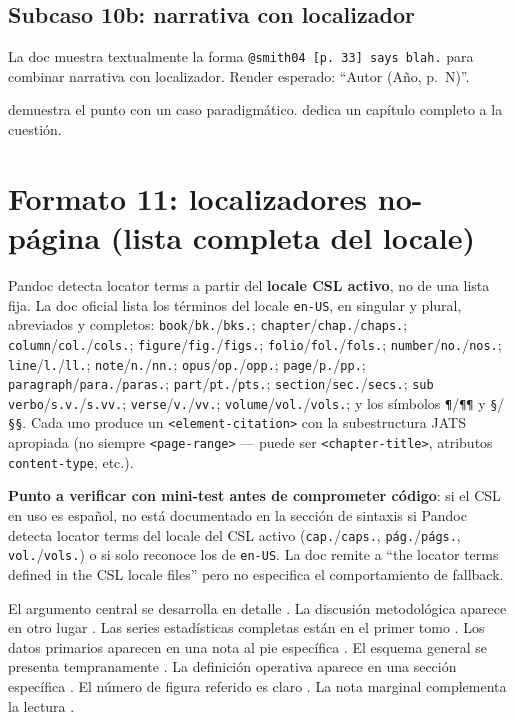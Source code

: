\subsection{Subcaso 10b: narrativa con localizador}
La doc muestra textualmente la forma \texttt{@smith04 [p. 33] says blah.} para combinar narrativa con localizador. Render esperado: “Autor (Año, p. N)”.

\textcite[p. 33]{2961-KACZAN2016} demuestra el punto con un caso paradigmático. \textcite[pp. 12-18]{3036-ORBUCH2020} dedica un capítulo completo a la cuestión.



\section{Formato 11: localizadores no-página (lista completa del locale)}
Pandoc detecta locator terms a partir del \textbf{locale CSL activo}, no de una lista fija. La doc oficial lista los términos del locale \texttt{en-US}, en singular y plural, abreviados y completos: \texttt{book}/\texttt{bk.}/\texttt{bks.}; \texttt{chapter}/\texttt{chap.}/\texttt{chaps.}; \texttt{column}/\texttt{col.}/\texttt{cols.}; \texttt{figure}/\texttt{fig.}/\texttt{figs.}; \texttt{folio}/\texttt{fol.}/\texttt{fols.}; \texttt{number}/\texttt{no.}/\texttt{nos.}; \texttt{line}/\texttt{l.}/\texttt{ll.}; \texttt{note}/\texttt{n.}/\texttt{nn.}; \texttt{opus}/\texttt{op.}/\texttt{opp.}; \texttt{page}/\texttt{p.}/\texttt{pp.}; \texttt{paragraph}/\texttt{para.}/\texttt{paras.}; \texttt{part}/\texttt{pt.}/\texttt{pts.}; \texttt{section}/\texttt{sec.}/\texttt{secs.}; \texttt{sub verbo}/\texttt{s.v.}/\texttt{s.vv.}; \texttt{verse}/\texttt{v.}/\texttt{vv.}; \texttt{volume}/\texttt{vol.}/\texttt{vols.}; y los símbolos \texttt{¶}/\texttt{¶¶} y \texttt{§}/\texttt{§§}. Cada uno produce un \texttt{<element-citation>} con la subestructura JATS apropiada (no siempre \texttt{<page-range>} — puede ser \texttt{<chapter-title>}, atributos \texttt{content-type}, etc.).

\textbf{Punto a verificar con mini-test antes de comprometer código}: si el CSL en uso es español, no está documentado en la sección de sintaxis si Pandoc detecta locator terms del locale del CSL activo (\texttt{cap.}/\texttt{caps.}, \texttt{pág.}/\texttt{págs.}, \texttt{vol.}/\texttt{vols.}) o si solo reconoce los de \texttt{en-US}. La doc remite a “the locator terms defined in the CSL locale files” pero no especifica el comportamiento de fallback.

El argumento central se desarrolla en detalle \autocite[chap. 3]{3036-ORBUCH2020}. La discusión metodológica aparece en otro lugar \autocite[sec. 2.1]{3041-PINEAU1999}. Las series estadísticas completas están en el primer tomo \autocite[vol. 1, p. 45]{3036-ORBUCH2020}. Los datos primarios aparecen en una nota al pie específica \autocite[n. 12]{2961-KACZAN2016}. El esquema general se presenta tempranamente \autocite[pt. 1]{3036-ORBUCH2020}. La definición operativa aparece en una sección específica \autocite[sec. 4]{3041-PINEAU1999}. El número de figura referido es claro \autocite[fig. 7]{3036-ORBUCH2020}. La nota marginal complementa la lectura \autocite[¶ 5]{2961-KACZAN2016}.


